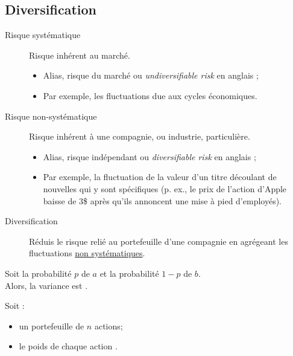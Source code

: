 \documentclass[10pt, french]{article}
\begin{document}
\begin{multicols*}{2}
\columnbreak
\subsection{Diversification}
\begin{definitionNOHFILLprop}
\begin{description}
	\item[Risque systématique]	Risque inhérent au marché. 
		\begin{itemize}
		\item	Alias, risque du marché ou \og \textit{undiversifiable risk} \fg{} en anglais ;
		\item	Par exemple, les fluctuations due aux cycles économiques.
		\end{itemize}
	\item[Risque non-systématique]	Risque inhérent à une compagnie, ou industrie, particulière.
		\begin{itemize}
		\item	Alias, risque indépendant ou \og \textit{diversifiable risk} \fg{} en anglais ;
		\item	Par exemple, la fluctuation de la valeur d'un titre découlant de nouvelles qui y sont spécifiques (p. ex., le prix de l'action d'Apple baisse de 3\$ après qu'ils annoncent une mise à pied d'employés).
		\end{itemize}
	\item[Diversification]	Réduis le risque relié au portefeuille d'une compagnie en agrégeant les fluctuations \underline{non systématiques}. 
\end{description}
\end{definitionNOHFILLprop}

\begin{rappel_enhanced}
Soit la probabilité $p$ de $a$ et la probabilité $1 - p$ de $b$.\\
Alors, la variance est .
\end{rappel_enhanced}

Soit :
\begin{itemize}
	\item	un portefeuille de $n$ actions;
	\item	le poids de chaque action .
\end{itemize}


\end{multicols*}
\end{document}
